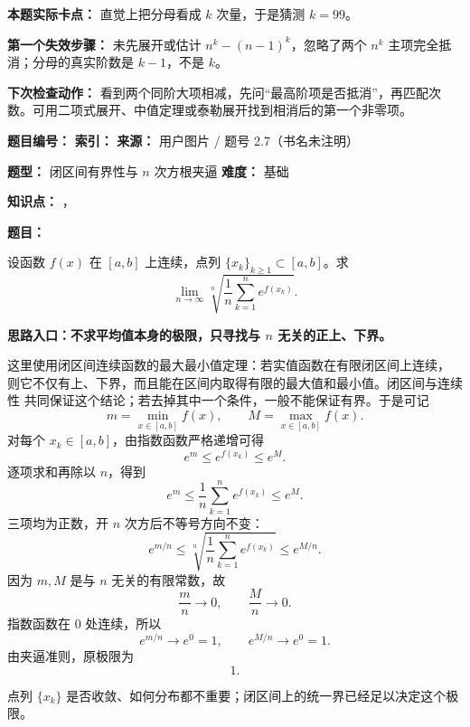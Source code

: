 \begin{mistakeBox}
\textbf{本题实际卡点：} 直觉上把分母看成 $k$ 次量，于是猜测 $k=99$。

\textbf{第一个失效步骤：} 未先展开或估计 $n^k-(n-1)^k$，忽略了两个 $n^k$ 主项完全抵消；分母的真实阶数是 $k-1$，不是 $k$。

\textbf{下次检查动作：} 看到两个同阶大项相减，先问“最高阶项是否抵消”，再匹配次数。可用二项式展开、中值定理或泰勒展开找到相消后的第一个非零项。
\end{mistakeBox}

\begin{problemBox}
\begin{problemMeta}
\textbf{题目编号：}  \quad
\textbf{索引：}  \quad
\textbf{来源：} 用户图片 / 题号 2.7（书名未注明）

\textbf{题型：} 闭区间有界性与 $n$ 次方根夹逼 \quad
\textbf{难度：} 基础

\textbf{知识点：} ，
\end{problemMeta}

\textbf{题目：}

设函数 $f(x)$ 在 $[a,b]$ 上连续，点列
$\{x_k\}_{k\ge1}\subset[a,b]$。求
\[
\lim_{n\to\infty}
\sqrt[n]{\frac1n\sum_{k=1}^{n}e^{f(x_k)}}.
\]
\end{problemBox}

\begin{solutionBox}
\textbf{思路入口：不求平均值本身的极限，只寻找与 $n$ 无关的正上、下界。}

这里使用闭区间连续函数的最大最小值定理：若实值函数在有限闭区间上连续，
则它不仅有上、下界，而且能在区间内取得有限的最大值和最小值。闭区间与连续性
共同保证这个结论；若去掉其中一个条件，一般不能保证有界。于是可记
\[
m=\min_{x\in[a,b]}f(x),\qquad
M=\max_{x\in[a,b]}f(x).
\]
对每个 $x_k\in[a,b]$，由指数函数严格递增可得
\[
e^m\le e^{f(x_k)}\le e^M.
\]
逐项求和再除以 $n$，得到
\[
e^m\le
\frac1n\sum_{k=1}^{n}e^{f(x_k)}
\le e^M.
\]
三项均为正数，开 $n$ 次方后不等号方向不变：
\[
e^{m/n}\le
\sqrt[n]{\frac1n\sum_{k=1}^{n}e^{f(x_k)}}
\le e^{M/n}.
\]
因为 $m,M$ 是与 $n$ 无关的有限常数，故
\[
\frac{m}{n}\to0,\qquad \frac{M}{n}\to0.
\]
指数函数在 $0$ 处连续，所以
\[
e^{m/n}\to e^0=1,\qquad e^{M/n}\to e^0=1.
\]
由夹逼准则，原极限为
\[
\boxed{1}.
\]

点列 $\{x_k\}$ 是否收敛、如何分布都不重要；闭区间上的统一界已经足以决定这个极限。
\end{solutionBox}

